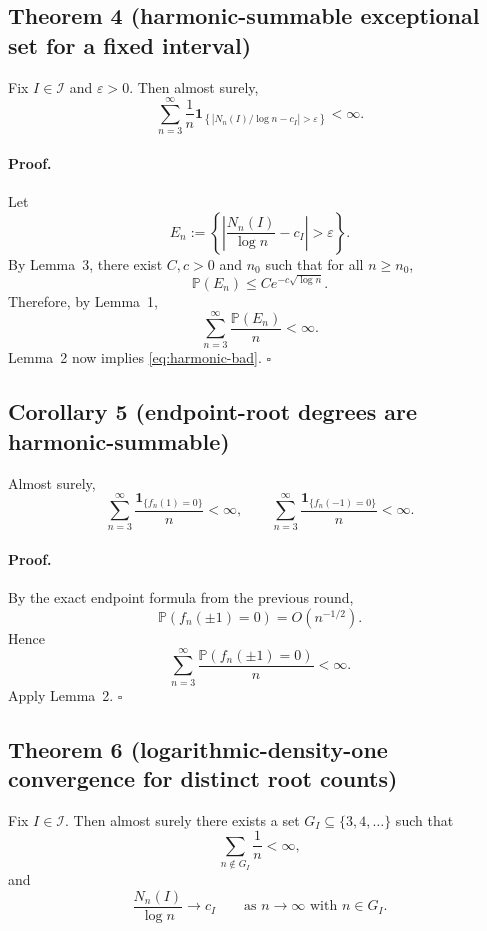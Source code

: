 \subsection*{Theorem 4 (harmonic-summable exceptional set for a fixed interval)}
Fix $I\in\mathcal I$ and $\varepsilon>0$. Then almost surely,
\begin{equation}\label{eq:harmonic-bad}
\sum_{n=3}^{\infty}\frac{1}{n}
\mathbf 1_{\left\{\left|N_n(I)/\log n-c_I\right|>\varepsilon\right\}}<\infty.
\end{equation}

\paragraph{Proof.}
Let
\[
E_n:=\left\{\left|\frac{N_n(I)}{\log n}-c_I\right|>\varepsilon\right\}.
\]
By Lemma~3, there exist $C,c>0$ and $n_0$ such that for all $n\ge n_0$,
\[
\mathbb P(E_n)\le C e^{-c\sqrt{\log n}}.
\]
Therefore, by Lemma~1,
\[
\sum_{n=3}^{\infty}\frac{\mathbb P(E_n)}{n}<\infty.
\]
Lemma~2 now implies \eqref{eq:harmonic-bad}.
\hfill$\square$

\subsection*{Corollary 5 (endpoint-root degrees are harmonic-summable)}
Almost surely,
\[
\sum_{n=3}^{\infty}\frac{\mathbf 1_{\{f_n(1)=0\}}}{n}<\infty,
\qquad
\sum_{n=3}^{\infty}\frac{\mathbf 1_{\{f_n(-1)=0\}}}{n}<\infty.
\]

\paragraph{Proof.}
By the exact endpoint formula from the previous round,
\[
\mathbb P(f_n(\pm1)=0)=O(n^{-1/2}).
\]
Hence
\[
\sum_{n=3}^{\infty}\frac{\mathbb P(f_n(\pm1)=0)}{n}<\infty.
\]
Apply Lemma~2.
\hfill$\square$

\subsection*{Theorem 6 (logarithmic-density-one convergence for distinct root counts)}
Fix $I\in\mathcal I$. Then almost surely there exists a set $G_I\subseteq\{3,4,\dots\}$ such that
\begin{equation}\label{eq:harmonic-good}
\sum_{n\notin G_I}\frac1n<\infty,
\end{equation}
and
\begin{equation}\label{eq:GI-limit}
\frac{N_n(I)}{\log n}\to c_I
\qquad\text{as }n\to\infty\text{ with }n\in G_I.
\end{equation}

